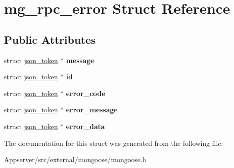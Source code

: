 \hypertarget{structmg__rpc__error}{}\section{mg\+\_\+rpc\+\_\+error Struct Reference}
\label{structmg__rpc__error}
\subsection*{Public Attributes}
\begin{DoxyCompactItemize}
\item 
struct \hyperlink{structjson__token}{json\+\_\+token} $\ast$ {\bfseries message}\hypertarget{structmg__rpc__error_a26d69a75e899c104f8e72b5964e7bebd}{}\label{structmg__rpc__error_a26d69a75e899c104f8e72b5964e7bebd}

\item 
struct \hyperlink{structjson__token}{json\+\_\+token} $\ast$ {\bfseries id}\hypertarget{structmg__rpc__error_a1d656c7b0f345c6b4dabdcdbc731c9a8}{}\label{structmg__rpc__error_a1d656c7b0f345c6b4dabdcdbc731c9a8}

\item 
struct \hyperlink{structjson__token}{json\+\_\+token} $\ast$ {\bfseries error\+\_\+code}\hypertarget{structmg__rpc__error_abc71688a1a85dee9d31cd0077228d3b7}{}\label{structmg__rpc__error_abc71688a1a85dee9d31cd0077228d3b7}

\item 
struct \hyperlink{structjson__token}{json\+\_\+token} $\ast$ {\bfseries error\+\_\+message}\hypertarget{structmg__rpc__error_a48b5c825149b7ed257e80be9d7930bf1}{}\label{structmg__rpc__error_a48b5c825149b7ed257e80be9d7930bf1}

\item 
struct \hyperlink{structjson__token}{json\+\_\+token} $\ast$ {\bfseries error\+\_\+data}\hypertarget{structmg__rpc__error_ac776ef39ac336b5f92b9976c8432db6b}{}\label{structmg__rpc__error_ac776ef39ac336b5f92b9976c8432db6b}

\end{DoxyCompactItemize}


The documentation for this struct was generated from the following file\+:\begin{DoxyCompactItemize}
\item 
Appserver/src/external/mongoose/mongoose.\+h\end{DoxyCompactItemize}

